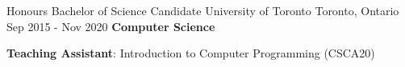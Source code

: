 
\begin{cventries}
  \cventry
    {Honours Bachelor of Science Candidate}
    {University of Toronto}
    {Toronto, Ontario}
    {Sep 2015 - Nov 2020}
    {\textbf{Computer Science}}
    {
      \begin{cvitems}
        \item {\textbf{Teaching Assistant}: Introduction to Computer Programming (CSCA20)}
      \end{cvitems}
    }
\end{cventries}
